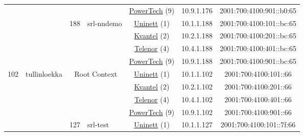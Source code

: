 \begin{small}
\begin{center}
\begin{longtable}{|c|c|c|c|c|c|c|c|}
  &  &  &  & \multicolumn{2}{|c|}{\tiny{\href{http://www.powertech.no}{PowerTech} (9)}} & \tiny{10.9.1.176} & \tiny{2001:700:4100:901::b0:65} \\* \cline{3-3}\cline{4-4}\cline{5-5}\cline{6-6}\cline{7-7}\cline{8-8}
  &  & \multirow{4}{*}{\tiny{188}} & \multicolumn{1}{|l|}{\multirow{4}{*}{\tiny{srl-nndemo}}} & \multicolumn{2}{|c|}{\tiny{\href{https://www.uninett.no}{Uninett} (1)}} & \tiny{10.1.1.188} & \tiny{2001:700:4100:101::bc:65} \\* \cline{5-5}\cline{6-6}\cline{7-7}\cline{8-8}
  &  &  &  & \multicolumn{2}{|c|}{\tiny{\href{http://kvantel.no}{Kvantel} (2)}} & \tiny{10.2.1.188} & \tiny{2001:700:4100:201::bc:65} \\* \cline{5-5}\cline{6-6}\cline{7-7}\cline{8-8}
  &  &  &  & \multicolumn{2}{|c|}{\tiny{\href{https://www.telenor.no}{Telenor} (4)}} & \tiny{10.4.1.188} & \tiny{2001:700:4100:401::bc:65} \\* \cline{5-5}\cline{6-6}\cline{7-7}\cline{8-8}
  &  &  &  & \multicolumn{2}{|c|}{\tiny{\href{http://www.powertech.no}{PowerTech} (9)}} & \tiny{10.9.1.188} & \tiny{2001:700:4100:901::bc:65} \\ \hline
 \multirow{24}{*}{\tiny{102}} & \multicolumn{1}{|l|}{\multirow{24}{*}{\tiny{tullinloekka}}} & \multicolumn{2}{|c|}{\multirow{4}{*}{\tiny{Root Context}}} & \multicolumn{2}{|c|}{\tiny{\href{https://www.uninett.no}{Uninett} (1)}} & \tiny{10.1.1.102} & \tiny{2001:700:4100:101::66} \\* \cline{5-5}\cline{6-6}\cline{7-7}\cline{8-8}
  &  & \multicolumn{2}{|c|}{} & \multicolumn{2}{|c|}{\tiny{\href{http://kvantel.no}{Kvantel} (2)}} & \tiny{10.2.1.102} & \tiny{2001:700:4100:201::66} \\* \cline{5-5}\cline{6-6}\cline{7-7}\cline{8-8}
  &  & \multicolumn{2}{|c|}{} & \multicolumn{2}{|c|}{\tiny{\href{https://www.telenor.no}{Telenor} (4)}} & \tiny{10.4.1.102} & \tiny{2001:700:4100:401::66} \\* \cline{5-5}\cline{6-6}\cline{7-7}\cline{8-8}
  &  & \multicolumn{2}{|c|}{} & \multicolumn{2}{|c|}{\tiny{\href{http://www.powertech.no}{PowerTech} (9)}} & \tiny{10.9.1.102} & \tiny{2001:700:4100:901::66} \\* \cline{3-3}\cline{4-4}\cline{5-5}\cline{6-6}\cline{7-7}\cline{8-8}
  &  & \multirow{4}{*}{\tiny{127}} & \multicolumn{1}{|l|}{\multirow{4}{*}{\tiny{srl-test}}} & \multicolumn{2}{|c|}{\tiny{\href{https://www.uninett.no}{Uninett} (1)}} & \tiny{10.1.1.127} & \tiny{2001:700:4100:101::7f:66} \\* \cline{5-5}\cline{6-6}\cline{7-7}\cline{8-8}

\end{longtable}
\end{center}
\end{small}

